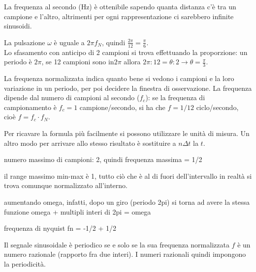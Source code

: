 La frequenza al secondo (Hz) è ottenibile sapendo quanta distanza c'è tra un campione e l'altro, altrimenti per ogni rappresentazione ci sarebbero infinite sinusoidi.

La pulsazione $\omega$ è uguale a $2\pi f_N$, quindi $\frac{2\pi}{12} = \frac{\pi}{6}$. \\
Lo sfasamento con anticipo di 2 campioni si trova effettuando la proporzione: un periodo è $2\pi$, se 12 campioni sono in$2\pi$ allora $2\pi : 12 = \theta : 2 \rightarrow \theta = \frac{\pi}{3}$.

La frequenza normalizzata indica quanto bene si vedono i campioni e la loro variazione in un periodo, per poi decidere la finestra di osservazione. La frequenza dipende dal numero di campioni al secondo ($f_c$): se la frequenza di campionamento è $f_c = 1$ campione/secondo, si ha che $f = 1/12$ ciclo/secondo, cioè $f = f_c \cdot f_N$.

Per ricavare la formula più facilmente si possono utilizzare le unità di misura. Un altro modo per arrivare allo stesso risultato è sostituire a $n\Delta t$ la $t$.


numero massimo di campioni: 2, quindi frequenza massima = 1/2

il range massimo min-max è 1, tutto ciò che è al di fuori dell'intervallo in realtà si trova comunque normalizzato all'interno.

aumentando omega, infatti, dopo un giro (periodo 2pi) si torna ad avere la stessa funzione
omega + multipli interi di 2pi = omega

frequenza di nyquist fn = -1/2 + 1/2

Il segnale sinusoidale è periodico se e solo se la sua frequenza normalizzata $f$ è un numero razionale (rapporto fra due interi). I numeri razionali quindi impongono la periodicità. 

